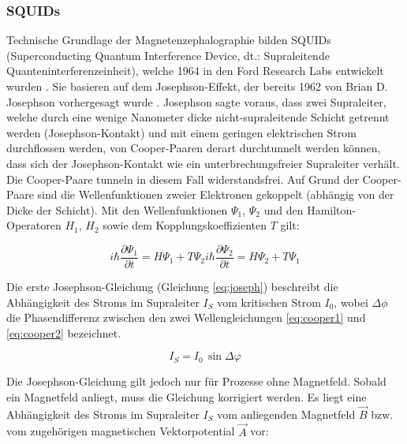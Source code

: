 \documentclass[doc,a4paper,12pt]{apa6}
\begin{document}
\subsubsection{SQUIDs}
\label{sec:squids}

Technische Grundlage der Magnetenzephalographie bilden SQUIDs (Superconducting Quantum Interference Device, dt.: Supraleitende Quanteninterferenzeinheit), welche 1964 in den Ford Research Labs entwickelt wurden \parencite{jaklevic1964quantum}. Sie basieren auf dem Josephson-Effekt, der bereits 1962 von Brian D. Josephson vorhergesagt wurde \parencite{josephson1962possible}. Josephson sagte voraus, dass zwei Supraleiter, welche durch eine wenige Nanometer dicke nicht-supraleitende Schicht getrennt werden (Josephson-Kontakt) und mit einem geringen elektrischen Strom durchflossen werden, von Cooper-Paaren derart durchtunnelt werden können, dass sich der Josephson-Kontakt wie ein unterbrechungsfreier Supraleiter verhält. Die Cooper-Paare tunneln in diesem Fall widerstandsfrei.
Auf Grund der Cooper-Paare sind die Wellenfunktionen zweier Elektronen gekoppelt (abhängig von der Dicke der Schicht). Mit den Wellenfunktionen $\Psi_1$, $\Psi_2$ und den Hamilton-Operatoren $H_1$, $H_2$ sowie dem Kopplungskoeffizienten $T$ gilt:

\begin{subequations}
\label{eq:cooper}
  \begin{equation} i\hbar \frac{\partial \Psi_1}{\partial t} = H \Psi_1 + T \Psi_2 \label{eq:cooper1}\end{equation}
   \begin{equation} i\hbar \frac{\partial \Psi_2}{\partial t} = H \Psi_2 + T \Psi_1 \label{eq:cooper2}\end{equation}
\end{subequations}

Die erste Josephson-Gleichung (Gleichung \ref{eq:joseph}) beschreibt die Abhängigkeit des Stroms im Supraleiter $I_S$ vom kritischen Strom $I_0$, wobei $\Delta \phi$ die Phasendifferenz zwischen den zwei Wellengleichungen \ref{eq:cooper1} und \ref{eq:cooper2} bezeichnet.

\begin{equation}
\label{eq:joseph}
I_S = I_0\,\sin{\Delta \varphi}
\end{equation}

Die Josephson-Gleichung gilt jedoch nur für Prozesse ohne Magnetfeld. Sobald ein Magnetfeld anliegt, muss die Gleichung korrigiert werden. Es liegt eine Abhängigkeit des Stroms im Supraleiter $I_S$ vom anliegenden Magnetfeld $\vec{B}$ bzw. vom zugehörigen magnetischen Vektorpotential $\vec{A}$ vor:
\end{document}

